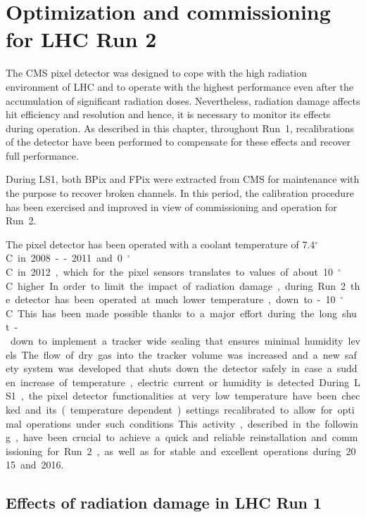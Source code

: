 \chapter{Optimization and commissioning for LHC Run 2}\label{ch:BPixCalib}

The CMS pixel detector was designed to cope with the high radiation environment of LHC and to operate with the highest performance even after the accumulation of significant radiation doses.
Nevertheless, radiation damage affects hit efficiency and resolution and hence, it is necessary to monitor its effects during operation.
As described in this chapter, throughout Run~1, recalibrations of the detector have been performed to compensate for these effects and recover full performance.

During LS1, both BPix and FPix were extracted from CMS for maintenance with the purpose to recover broken channels.
In this period, the calibration procedure has been exercised and improved in view of commissioning and operation for Run~2.

The pixel detector has been operated with a coolant temperature of 7.4\unit{$^\circ$C} in 2008--2011 and 0\unit{$^\circ$C} in 2012, which for the pixel sensors translates to values of about 10\unit{$^\circ$C} higher.
In order to limit the impact of radiation damage, during Run~2 the detector has been operated at much lower temperature, down to -10\unit{$^\circ$C}.
This has been made possible thanks to a major effort during the long shut-down to implement a tracker wide sealing that ensures minimal humidity levels.
The flow of dry gas into the tracker volume was increased and a new safety system was developed that shuts down the detector safely in case a sudden increase of temperature, electric current or humidity is detected. 
During LS1, the pixel detector functionalities at very low temperature have been checked and its (temperature dependent) settings recalibrated to allow for optimal operations under such conditions.
This activity, described in the following, have been crucial to achieve a quick and reliable reinstallation and commissioning for Run~2, as well as for stable and excellent operations during 2015 and 2016.

\section{Effects of radiation damage in LHC Run 1}

